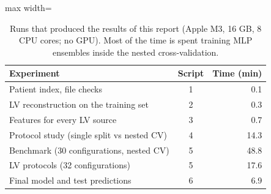 \begin{table}[H]
\centering
\small
\setlength{\tabcolsep}{4pt}
\begin{adjustbox}{max width=\linewidth}
\begin{tabular}{lcr}
\toprule
Experiment & Script & Time (min) \\
\midrule
Patient index, file checks & 1 & 0.1 \\
LV reconstruction on the training set & 2 & 0.3 \\
Features for every LV source & 3 & 0.7 \\
Protocol study (single split vs nested CV) & 4 & 14.3 \\
Benchmark (30 configurations, nested CV) & 5 & 48.8 \\
LV protocols (32 configurations) & 5 & 17.6 \\
Final model and test predictions & 6 & 6.9 \\
\bottomrule
\end{tabular}
\end{adjustbox}
\caption{Runs that produced the results of this report (Apple M3, 16 GB, 8 CPU cores; no GPU). Most of the time is spent training MLP ensembles inside the nested cross-validation.}
\label{tab:supp-runs}
\end{table}
